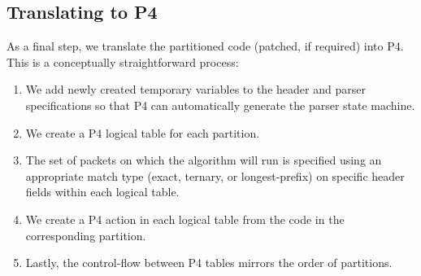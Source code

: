 \subsection{Translating to P4}
As a final step, we translate the partitioned code (patched, if required)
into P4. This is a conceptually straightforward process:
\begin{enumerate}
\item We add newly created temporary variables to the header and parser
specifications so that P4 can automatically generate the parser state machine.
\item We create a P4 logical table for each partition.
\item The set of packets on which the algorithm will run is specified using
an appropriate match type (exact, ternary, or longest-prefix) on specific
header fields within each logical table.
\item We create a P4 action in each logical table from the code in the
corresponding partition.
\item Lastly, the control-flow between P4 tables mirrors the order of
partitions.
\end{enumerate}

%
